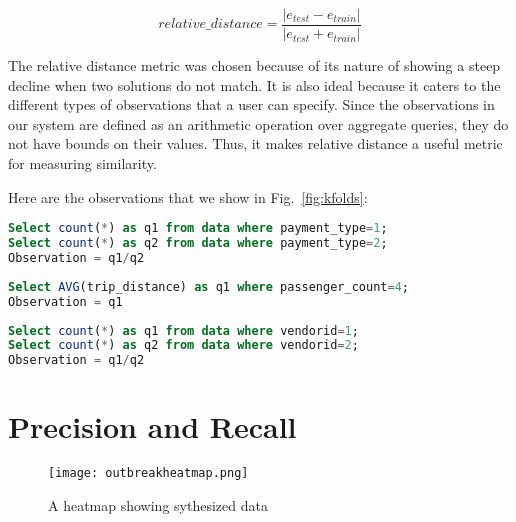 $$relative\_distance = \frac{|e_{test}-e_{train}|}{|e_{test}+e_{train}|}$$

The relative distance metric was chosen because of its nature of showing a steep decline when two solutions do not match. It is also ideal because it caters to the different types of observations that a user can specify. Since the observations in our system are defined as an arithmetic operation over aggregate queries, they do not have bounds on their values. Thus, it makes relative distance a useful metric for measuring similarity.

Here are the observations that we show in Fig.~\ref{fig:kfolds}:
\renewcommand{\lstlistingname}{Query}%
\begin{lstlisting}[language=SQL, caption=o1 for Fig.~\ref{fig:kfolds}, label=qry:o1]
Select count(*) as q1 from data where payment_type=1;
Select count(*) as q2 from data where payment_type=2;
Observation = q1/q2
\end{lstlisting}

\begin{lstlisting}[language=SQL, caption=o2 for Fig.~\ref{fig:kfolds}, label=qry:o2]
Select AVG(trip_distance) as q1 where passenger_count=4;
Observation = q1
\end{lstlisting}

\begin{lstlisting}[language=SQL, caption=o3 for Fig.~\ref{fig:kfolds}, label=qry:o3]
Select count(*) as q1 from data where vendorid=1;
Select count(*) as q2 from data where vendorid=2;
Observation = q1/q2
\end{lstlisting}

\section{Precision and Recall}
\begin{wrapfigure}{L}{0.5\textwidth}
  \begin{center}
    \texttt{[image: outbreakheatmap.png]}
  \end{center}
  \caption{A heatmap showing sythesized data}
  \label{fig:synthesized_data}
\end{wrapfigure}

